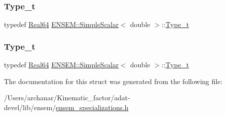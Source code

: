 \mbox{\label{structENSEM_1_1SimpleScalar_3_01double_01_4_a1f42edea984ac3b783290e5043381603}} 
\subsubsection{\texorpdfstring{Type\_t}{Type\_t}\hspace{0.1cm}{\footnotesize\ttfamily [2/3]}}
{\footnotesize\ttfamily typedef \mbox{\hyperlink{group__defs_gaae0bff35c031375b1ffeb693402496c8}{Real64}} \mbox{\hyperlink{structENSEM_1_1SimpleScalar}{E\+N\+S\+E\+M\+::\+Simple\+Scalar}}$<$ double $>$\+::\mbox{\hyperlink{structENSEM_1_1SimpleScalar_3_01double_01_4_a1f42edea984ac3b783290e5043381603}{Type\+\_\+t}}}

\mbox{\label{structENSEM_1_1SimpleScalar_3_01double_01_4_a1f42edea984ac3b783290e5043381603}} 
\subsubsection{\texorpdfstring{Type\_t}{Type\_t}\hspace{0.1cm}{\footnotesize\ttfamily [3/3]}}
{\footnotesize\ttfamily typedef \mbox{\hyperlink{group__defs_gaae0bff35c031375b1ffeb693402496c8}{Real64}} \mbox{\hyperlink{structENSEM_1_1SimpleScalar}{E\+N\+S\+E\+M\+::\+Simple\+Scalar}}$<$ double $>$\+::\mbox{\hyperlink{structENSEM_1_1SimpleScalar_3_01double_01_4_a1f42edea984ac3b783290e5043381603}{Type\+\_\+t}}}



The documentation for this struct was generated from the following file\+:\begin{DoxyCompactItemize}
\item 
/\+Users/archanar/\+Kinematic\+\_\+factor/adat-\/devel/lib/ensem/\mbox{\hyperlink{adat-devel_2lib_2ensem_2ensem__specializations_8h}{ensem\+\_\+specializations.\+h}}\end{DoxyCompactItemize}
